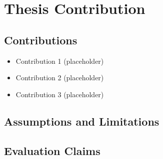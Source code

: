\chapter{Thesis Contribution}

\section{Contributions}
\begin{itemize}
  \item Contribution 1 (placeholder)
  \item Contribution 2 (placeholder)
  \item Contribution 3 (placeholder)
\end{itemize}

\section{Assumptions and Limitations}

\section{Evaluation Claims}
